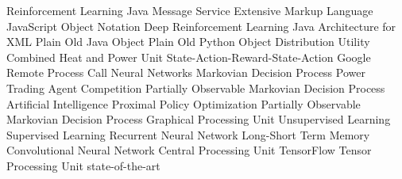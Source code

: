 \begin        {acronym}[Bash]

	       {Reinforcement Learning}
	      {Java Message Service}
	      {Extensive Markup Language}
	     {JavaScript Object Notation}
	   {Deep Reinforcement Learning}
	     {Java Architecture for XML}
	     {Plain Old Java Object}
	     {Plain Old Python Object}
	       {Distribution Utility}
	      {Combined Heat and Power Unit}
	    {State-Action-Reward-State-Action}
	     {Google Remote Process Call}
	       {Neural Networks}
	      {Markovian Decision Process}
	 {Power Trading Agent Competition}
	    {Partially Observable Markovian Decision Process}
	       {Artificial Intelligence}
	      {Proximal Policy Optimization}
	    {Partially Observable Markovian Decision Process}
	      {Graphical Processing Unit}
               {Unsupervised Learning}
               {Supervised Learning}
              {Recurrent Neural Network}
             {Long-Short Term Memory}
              {Convolutional Neural Network}
	      {Central Processing Unit}
	       {TensorFlow}
	      {Tensor Processing Unit}
	     {state-of-the-art}

\end          {acronym}
